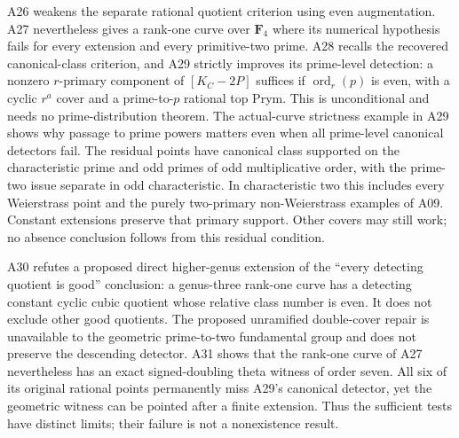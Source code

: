 \documentclass[11pt,a4paper]{article}
\begin{document}
A26 weakens the separate rational quotient criterion using even
augmentation. A27 nevertheless gives a rank-one curve over $\mathbf F_4$
where its numerical hypothesis fails for every extension and every
primitive-two prime. A28 recalls the recovered canonical-class criterion,
and A29 strictly improves its prime-level detection: a nonzero
$r$-primary component of $[K_C-2P]$ suffices if
$\operatorname{ord}_r(p)$ is even, with a cyclic $r^a$ cover and a
prime-to-$p$ rational top Prym. This is unconditional and needs no
prime-distribution theorem. The actual-curve strictness example in A29
shows why passage to prime powers matters even when all prime-level
canonical detectors fail. The residual points have canonical class
supported on the characteristic prime and odd primes of odd
multiplicative order, with the prime-two issue separate in odd
characteristic. In characteristic two this includes every Weierstrass
point and the purely two-primary non-Weierstrass examples of A09.
Constant extensions preserve that primary support. Other covers may
still work; no absence conclusion follows from this residual condition.

A30 refutes a proposed direct higher-genus extension of the
``every detecting quotient is good'' conclusion: a genus-three
rank-one curve has a detecting constant cyclic cubic quotient whose
relative class number is even. It does not exclude other good
quotients. The proposed unramified double-cover repair is unavailable
to the geometric prime-to-two fundamental group and does not preserve
the descending detector. A31 shows that the rank-one curve of A27
nevertheless has an exact signed-doubling theta witness of order seven.
All six of its original rational points permanently miss A29's
canonical detector, yet the geometric witness can be pointed after
a finite extension. Thus the sufficient tests have distinct limits;
their failure is not a nonexistence result.
\end{document}
